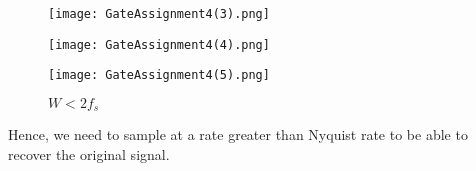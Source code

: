 \documentclass[journal,12pt,twocolumn]{IEEEtran}
\begin{document}
\begin{figure}[!h]
 \centering
 \texttt{[image: GateAssignment4(3).png]}
 \caption{$W>2f_s$}
 \label{plot}
 \texttt{[image: GateAssignment4(4).png]}
 \caption{$W=2f_s$}
 \label{plot}
 \texttt{[image: GateAssignment4(5).png]}
 \caption{$W<2f_s$}
 \label{plot}
\end{figure}

Hence, we need to sample at a rate greater than Nyquist rate to be able to recover the original signal.
\end{document}
